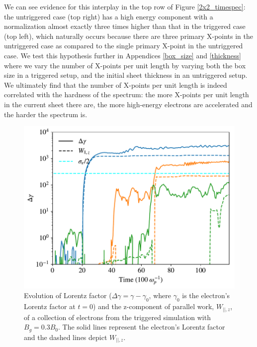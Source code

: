 We can see evidence for this interplay in the top row of Figure \ref{2x2_timespec}: the untriggered case (top right) has a high energy component with a normalization almost exactly three times higher than that in the triggered case (top left), which naturally occurs because there are three primary X-points in the untriggered case as compared to the single primary X-point in the untriggered case.  We test this hypothesis further in Appendices \ref{box_size} and \ref{thickness} where we vary the number of X-points per unit length by varying both the box size in a triggered setup, and the initial sheet thickness in an untriggered setup.  We ultimately find that the number of X-points per unit length is indeed correlated with the hardness of the spectrum: the more X-points per unit length in the current sheet there are, the more high-energy electrons are accelerated and the harder the spectrum is.

\begin{figure}[t]
\includegraphics[width=\linewidth]{manypart_wparz_deltagamma_log.pdf}
\caption{Evolution of Lorentz factor ($\Delta \gamma = \gamma - \gamma_{0}$, where $\gamma_{0}$ is the electron's Lorentz factor at $t=0$) and the z-component of parallel work, $W_{||,z}$, of a collection of electrons from the triggered simulation with $B_{g}=0.3B_{0}$.  The solid lines represent the electron's Lorentz factor and the dashed lines depict $W_{||,z}$.  }
\label{EdotV}
\end{figure}

